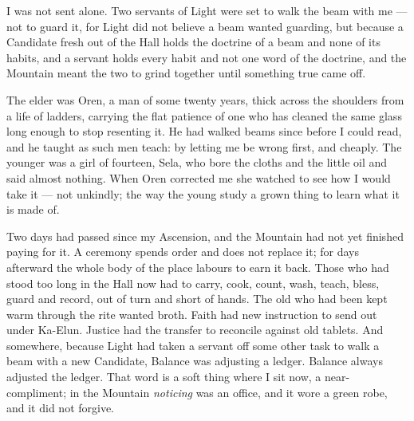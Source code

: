I was not sent alone. Two servants of Light were set to walk the beam with me --- not to guard it, for Light did not believe a beam wanted guarding, but because a Candidate fresh out of the Hall holds the doctrine of a beam and none of its habits, and a servant holds every habit and not one word of the doctrine, and the Mountain meant the two to grind together until something true came off.\par

The elder was Oren, a man of some twenty years, thick across the shoulders from a life of ladders, carrying the flat patience of one who has cleaned the same glass long enough to stop resenting it. He had walked beams since before I could read, and he taught as such men teach: by letting me be wrong first, and cheaply. The younger was a girl of fourteen, Sela, who bore the cloths and the little oil and said almost nothing. When Oren corrected me she watched to see how I would take it --- not unkindly; the way the young study a grown thing to learn what it is made of.\par

Two days had passed since my Ascension, and the Mountain had not yet finished paying for it. A ceremony spends order and does not replace it; for days afterward the whole body of the place labours to earn it back. Those who had stood too long in the Hall now had to carry, cook, count, wash, teach, bless, guard and record, out of turn and short of hands. The old who had been kept warm through the rite wanted broth. Faith had new instruction to send out under Ka-Elun. Justice had the transfer to reconcile against old tablets. And somewhere, because Light had taken a servant off some other task to walk a beam with a new Candidate, Balance was adjusting a ledger. Balance always adjusted the ledger. That word is a soft thing where I sit now, a near-compliment; in the Mountain \textit{noticing} was an office, and it wore a green robe, and it did not forgive.\par

\ornament

